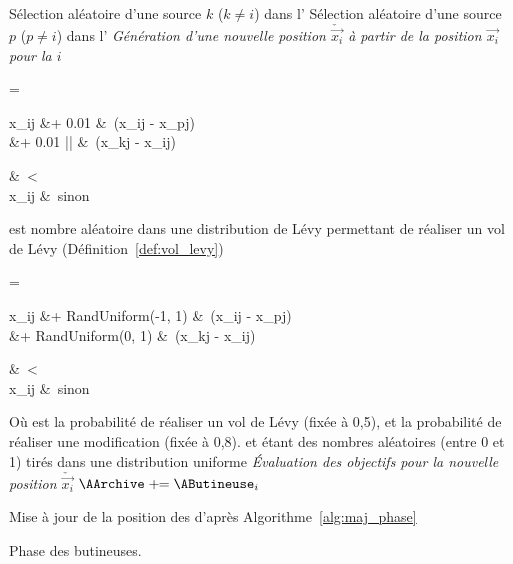 \begin{algorithm}\label{alg:employed_phase}
  \SetAlgoVlined
  \DontPrintSemicolon
  {
    Sélection aléatoire d’une source $k$ ($k \neq i$) dans l’\AArchive\;
    Sélection aléatoire d’une source $p$ ($p \neq i$) dans l’\AHive\;
    \BlankLine
     \emph{Génération d’une nouvelle position $\check{\vec{x_{i}}}$ à partir de la %
                       position $\vec{x_{i}}$ pour la \AButineuse $i$}\;
    \If{$\ATirageA < \ARatio $ }
      {
      {
      \begin{algomathdisplay}
         =%
          \begin{cases}
            \begin{aligned}
              x_{ij}  &+ 0.01 \times  \ALevy  &\times \ (x_{ij} - x_{pj})  \\
                      &+ 0.01 \times |\ALevy| &\times \ (x_{kj} - x_{ij})  \\
            \end{aligned} &\ \ATirageB < \AMR \\
            x_{ij}        &\ sinon
          \end{cases}
      \end{algomathdisplay}
      \ALevy est nombre aléatoire dans une distribution de Lévy
      permettant de réaliser un vol de Lévy (Définition~\ref{def:vol_levy})\;
      }
      }
    \Else
      {
      {
      \begin{algomathdisplay}
         =%
          \begin{cases}
            \begin{aligned}
              x_{ij}  &+ RandUniform(-1, 1)   &\times \ (x_{ij} - x_{pj})  \\
                      &+ RandUniform(0, 1)    &\times \ (x_{kj} - x_{ij})  \\
            \end{aligned} &\ \ATirageB < \AMR \\
            x_{ij}        &\ sinon
          \end{cases}
      \end{algomathdisplay}
      }
      }
      Où \ARatio est la probabilité de réaliser un vol de Lévy (fixée à 0,5), et \AMR la probabilité
      de réaliser une modification (fixée à 0,8). \ATirageA et \ATirageB étant des nombres aléatoires
      (entre 0 et 1) tirés dans une distribution uniforme\;
      \BlankLine
     \emph{Évaluation des objectifs pour la nouvelle position $\check{\vec{x_{i}}}$}\;
    {
      $\AArchive \pluseq \AButineuse_{i}$\;
    }
  }
  Mise à jour de la position des \ASources d’après Algorithme~\ref{alg:maj_phase}\;
  \caption{Phase des butineuses.}
\end{algorithm}

